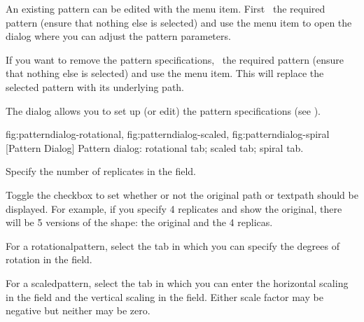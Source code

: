 
An existing \gls{pattern} can be edited with the 
menu item. First \select\ the required pattern (ensure that nothing else is
selected) and use the  menu item to open
the  dialog where you can adjust the pattern
parameters.


If you want to remove the pattern specifications, \select\ the
required pattern (ensure that nothing else is selected) and use the
 menu item.  This will replace the
selected \gls{pattern} with its underlying path.


The  dialog allows you to set up (or edit) the pattern
specifications (see ).

{
  {fig:patterndialog-rotational}{}{},
  {fig:patterndialog-scaled}{}{},
  {fig:patterndialog-spiral}{}{}
}
[Pattern Dialog]
{Pattern dialog:
 rotational tab;
 scaled tab;
 spiral tab.}


Specify the number of replicates in the  field.


Toggle the   checkbox to set whether
or not the original \gls*{path} or \gls*{textpath} should be
displayed. For example, if you specify 4 replicates and show the
original, there will be 5 versions of the shape: the original and
the 4 replicas.


For a \gls{rotationalpattern}, select the
 tab in which you can specify the degrees
of rotation in the  field.


For a \gls{scaledpattern}, select the  tab
in which you can enter the horizontal scaling in the
 field and the vertical scaling in 
the  field.
Either scale factor may be negative but neither may be zero.

